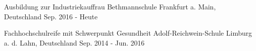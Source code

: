 

\begin{cventries}


    
  \cventry
    {Ausbildung zur Industriekauffrau} %
    {Bethmannschule} %
    {Frankfurt a. Main, Deutschland} %
    {Sep. 2016 - Heute} %
    {
    }
    \vspace{-4.0mm}

    
  \cventry
    {Fachhochschulreife mit Schwerpunkt Gesundheit} %
    {Adolf-Reichwein-Schule} %
    {Limburg a. d. Lahn, Deutschland} %
    {Sep. 2014 - Jun. 2016} %
    {
    }
    \vspace{-4.0mm}

    

\end{cventries}
